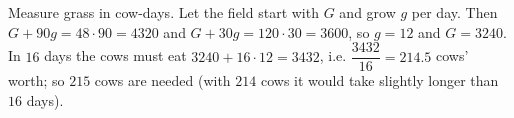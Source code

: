 Measure grass in cow-days. Let the field start with $G$ and grow $g$ per day. Then $G+90g=48\cdot90=4320$ and $G+30g=120\cdot30=3600$, so $g=12$ and $G=3240$. In $16$ days the cows must eat $3240+16\cdot12=3432$, i.e. $\dfrac{3432}{16}=214.5$ cows' worth; so $\boxed{215}$ cows are needed (with $214$ cows it would take slightly longer than $16$ days).
